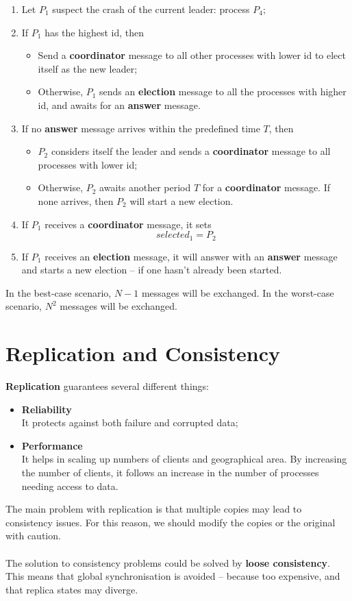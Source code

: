 \documentclass{article}
\begin{document}
\begin{enumerate}
	\item Let $P_1$ suspect the crash of the current leader: process $P_4$;
	\item If $P_1$ has the highest id, then
	\begin{itemize}
		\item Send a \textbf{coordinator} message to all other processes with lower id  to elect itself as the new leader;
		\item Otherwise, $P_1$ sends an \textbf{election} message to all the processes with higher id, and awaits for an \textbf{answer} message.
	\end{itemize}
	\item If no \textbf{answer} message arrives within the predefined time $T$, then
	\begin{itemize}
		\item $P_2$ considers itself the leader and sends a \textbf{coordinator} message to all processes with lower id;
		\item Otherwise, $P_2$ awaits another period $T$ for a \textbf{coordinator} message. If none arrives, then $P_2$ will start a new election.
	\end{itemize}
	\item If $P_1$ receives a \textbf{coordinator} message, it sets
	\[ selected_1 = P_2 \]
	\item If $P_1$ receives an \textbf{election} message, it will answer with an \textbf{answer} message and starts a new election -- if one hasn't already been started.
\end{enumerate}
In the best-case scenario, $N-1$ messages will be exchanged. In the worst-case scenario, $N^2$ messages will be exchanged.

\section{Replication and Consistency}
\textbf{Replication} guarantees several different things:
\begin{itemize}
	\item \textbf{Reliability} \\
	It protects against both failure and corrupted data;
	\item \textbf{Performance} \\
	It helps in scaling up numbers of clients and geographical area. By increasing the number of clients, it follows an increase in the number of processes needing access to data.
\end{itemize}
The main problem with replication is that multiple copies may lead to consistency issues. For this reason, we should modify the copies or the original with caution. \\ \\
The solution to consistency problems could be solved by \textbf{loose consistency}. This means that global synchronisation is avoided -- because too expensive, and that replica states may diverge.
\end{document}
